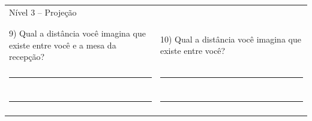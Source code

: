 \begin{table}[!htb]
\begin{tabular}{p{0.5\linewidth} p{0.5\linewidth}}
    \end{tabular}
    \begin{tabular}{p{0.5\linewidth} p{0.5\linewidth}}
        \large{Nível 3 – Projeção}  &\\
        & \\
        & \\
        9)	Qual a distância você imagina que existe entre você e a mesa da recepção? & 10)	Qual a distância você imagina que existe entre você? \\
        & \\
        \rule{\linewidth}{.2mm} & \rule{\linewidth}{.2mm}\\
        & \\
        \rule{\linewidth}{.2mm} & \rule{\linewidth}{.2mm}\\
        & \\
    \end{tabular}
\end{table}
%
